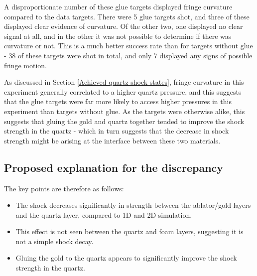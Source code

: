A disproportionate number of these glue targets displayed fringe curvature compared to the data targets. There were 5 glue targets shot, and three of these displayed clear evidence of curvature. Of the other two, one displayed no clear signal at all, and in the other it was not possible to determine if there was curvature or not. This is a much better success rate than for targets without glue - 38 of these targets were shot in total, and only 7 displayed any signs of possible fringe motion. 

As discussed in Section \ref{Achieved quartz shock states}, fringe curvature in this experiment generally correlated to a higher quartz pressure, and this suggests that the glue targets were far more likely to access higher pressures in this experiment than targets without glue. As the targets were otherwise alike, this suggests that gluing the gold and quartz together tended to improve the shock strength in the quartz - which in turn suggests that the decrease in shock strength might be arising at the interface between these two materials.


\subsection{Proposed explanation for the discrepancy} \label{Curvature and Pressure}

The key points are therefore as follows:
\begin{itemize}
    \item The shock decreases significantly in strength between the ablator/gold layers and the quartz layer, compared to 1D and 2D simulation.
    \item This effect is not seen between the quartz and foam layers, suggesting it is not a simple shock decay.
    \item Gluing the gold to the quartz appears to significantly improve the shock strength in the quartz.
\end{itemize}


